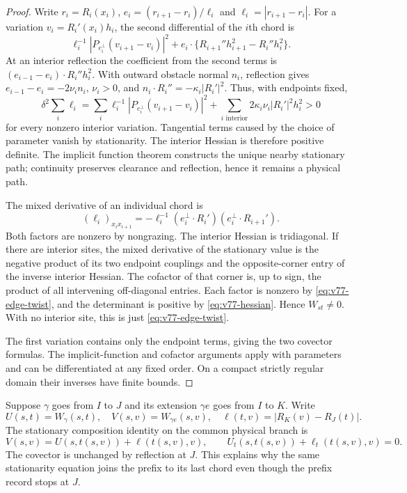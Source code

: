 \begin{proof}
Write $r_i=R_i(x_i)$, $e_i=(r_{i+1}-r_i)/\ell_i$ and
$\ell_i=|r_{i+1}-r_i|$.  For a variation $v_i=R_i'(x_i)h_i$, the
second differential of the $i$th chord is
\[
 \ell_i^{-1}|P_{e_i^\perp}(v_{i+1}-v_i)|^2
 +e_i\cdot\{R_{i+1}''h_{i+1}^2-R_i''h_i^2\}.
\]
At an interior reflection the coefficient from the second terms is
$(e_{i-1}-e_i)\cdot R_i''h_i^2$.  With outward obstacle normal $n_i$,
reflection gives $e_{i-1}-e_i=-2\nu_i n_i$, $\nu_i>0$, and
$n_i\cdot R_i''=-\kappa_i|R_i'|^2$.  Thus, with endpoints fixed,
\begin{equation}\label{eq:v77-hessian}
 \delta^2\sum_i\ell_i
 =\sum_i\ell_i^{-1}|P_{e_i^\perp}(v_{i+1}-v_i)|^2
  +\sum_{i\text{ interior}}2\kappa_i\nu_i|R_i'|^2h_i^2>0
\end{equation}
for every nonzero interior variation.  Tangential terms caused by the
choice of parameter vanish by stationarity.  The interior Hessian is
therefore positive definite.  The implicit function theorem constructs
the unique nearby stationary path; continuity preserves clearance and
reflection, hence it remains a physical path.

The mixed derivative of an individual chord is
\begin{equation}\label{eq:v77-edge-twist}
 (\ell_i)_{x_ix_{i+1}}
 =-\ell_i^{-1}
   (e_i^\perp\cdot R_i')(e_i^\perp\cdot R_{i+1}').
\end{equation}
Both factors are nonzero by nongrazing.  The interior Hessian is
tridiagonal.  If there are interior sites, the mixed derivative of the
stationary value is the negative product of its two endpoint couplings
and the opposite-corner entry of the inverse interior Hessian.  The
cofactor of that corner is, up to sign, the product of all intervening
off-diagonal entries.  Each factor is nonzero by
\eqref{eq:v77-edge-twist}, and the determinant is positive by
\eqref{eq:v77-hessian}.  Hence $W_{st}\ne0$.  With no interior site,
this is just \eqref{eq:v77-edge-twist}.

The first variation contains only the endpoint terms, giving the two
covector formulas.  The implicit-function and cofactor arguments apply
with parameters and can be differentiated at any fixed order.  On a
compact strictly regular domain their inverses have finite bounds.
\end{proof}

Suppose $\gamma$ goes from $I$ to $J$ and its extension $\gamma e$
goes from $I$ to $K$.  Write
\[
 U(s,t)=W_\gamma(s,t),\quad V(s,v)=W_{\gamma e}(s,v),\quad
 \ell(t,v)=|R_K(v)-R_J(t)|.
\]
The stationary composition identity on the common physical branch is
\begin{equation}\label{eq:v77-stationary-composition}
 V(s,v)=U(s,t(s,v))+\ell(t(s,v),v),\qquad
 U_t(s,t(s,v))+\ell_t(t(s,v),v)=0.
\end{equation}
The covector is unchanged by reflection at $J$.  This explains why the
same stationarity equation joins the prefix to its last chord even
though the prefix record stops at $J$.

